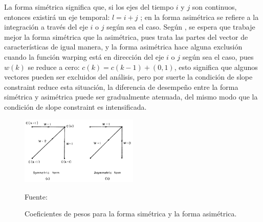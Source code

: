 \begin{enumerate}
\begin{enumerate}
La forma simétrica significa que, si los ejes del tiempo $i$ y $j$ son continuos, entonces existirá un eje temporal: $l = i + j$ ; en la forma asimétrica se refiere a la integración a través del eje $i$ o $j$ según sea el caso. Según \citep{sakoe}, se espera que trabaje mejor la forma simétrica que la asimétrica, pues trata las partes del vector de características de igual manera, y la forma asimétrica hace alguna exclusión cuando la función warping está en dirección del eje $i$ o $j$ según sea el caso, pues $w(k)$ se reduce a cero: $c(k) = c(k-1)+(0,1)$, esto significa que algunos vectores pueden ser excluidos del análisis, pero por suerte la condición de slope constraint reduce esta situación, la diferencia de desempeño entre la forma simétrica y asimétrica puede ser gradualmente atenuada, del mismo modo que la condición de slope constraint es intensificada.

\begin{figure}[H]
\begin{center}
\includegraphics[width=0.5\textwidth]{Imagenes/Cap2/image055}
\end{center}
\begin{center}
\vskip -0.5cm
\caption{\small{Coeficientes de pesos para la forma simétrica y la forma asimétrica.}}
\label{fig:figura2.54}
{\small{Fuente: \cite{sakoe}}}
\end{center}
\end{figure}


\end{enumerate}
\end{enumerate}
